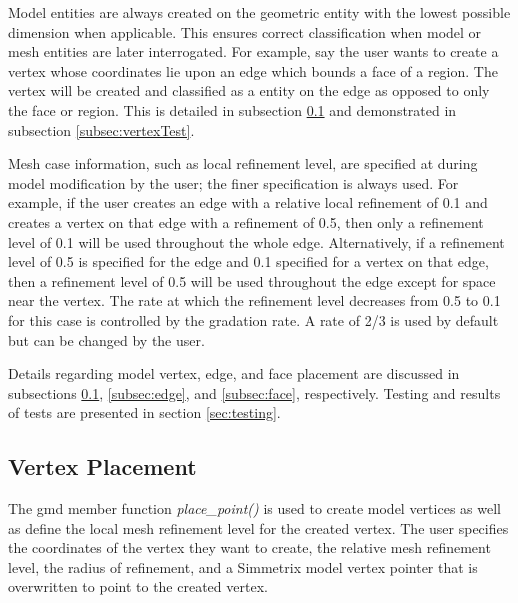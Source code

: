 \documentclass[a4paper, 12pt]{article}
\begin{document}
Model entities are always created on the geometric entity with the
lowest possible dimension when applicable. This ensures correct classification when model
or mesh entities are later interrogated. For example, say the
user wants to create a vertex whose coordinates lie upon an edge
which bounds a face of a region. The vertex will be created and 
classified as a entity on the edge as opposed to only the face or region. 
This is detailed in subsection \ref{subsec:vertex} and  demonstrated 
in subsection \ref{subsec:vertexTest}.

Mesh case information, such as local refinement level, are
specified at during model modification by the user; the finer
specification is always used. For example, if the user 
creates an edge with a relative local refinement of 0.1
and creates a vertex on that edge with a refinement of 0.5, 
then only a refinement level of 0.1 will be used throughout 
the whole edge. Alternatively, if a refinement level of 0.5 
is specified for the edge and 0.1 specified for a vertex on that
edge, then a refinement level of 0.5 will be used throughout the 
edge except for space near the vertex. The rate at which the 
refinement level decreases from 0.5 to 0.1 for this case is controlled
by the gradation rate. A rate of 2/3 is used by default 
but can be changed by the user. 

Details regarding model vertex, edge, and face placement are 
discussed in subsections \ref{subsec:vertex}, \ref{subsec:edge}, 
and \ref{subsec:face}, respectively. Testing and results of tests
are presented in section \ref{sec:testing}.

\subsection{Vertex Placement} \label{subsec:vertex}
The gmd member function \emph{place\_point()} is used to create model
vertices as well as define the local mesh refinement level for the created vertex.
The user specifies the coordinates of the vertex they want to create, the 
relative mesh refinement level, the radius of refinement, and a Simmetrix
model vertex pointer that is overwritten to point to the created vertex. 
\end{document}

